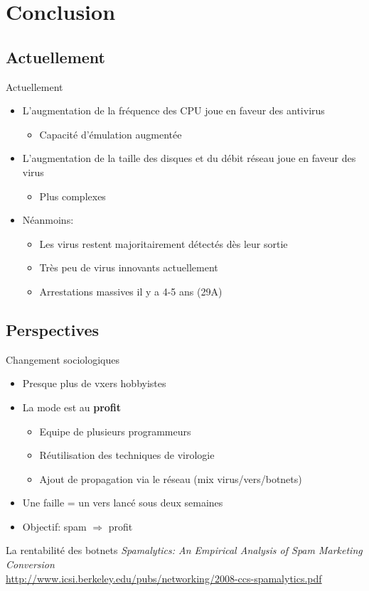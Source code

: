 \documentclass{beamer}
\begin{document}
\section{Conclusion}

\subsection{Actuellement}
\begin{frame}{Actuellement}
\begin{itemize}
\item L'augmentation de la fréquence des CPU joue en faveur des antivirus
\begin{itemize}
\item Capacité d'émulation augmentée
\end{itemize}
\item L'augmentation de la taille des disques et du débit réseau joue en faveur des virus
\begin{itemize}
\item Plus complexes
\end{itemize}
\item Néanmoins:
\begin{itemize}
\item Les virus restent majoritairement détectés dès leur sortie
\item Très peu de virus innovants actuellement
\item Arrestations massives il y a 4-5 ans (29A)
\end{itemize}
\end{itemize}
\end{frame}


\subsection{Perspectives}
\begin{frame}{Changement sociologiques}
\begin{itemize}
\item Presque plus de vxers hobbyistes
\item La mode est au \textbf{profit}
\begin{itemize}
\item Equipe de plusieurs programmeurs
\item Réutilisation des techniques de virologie
\item Ajout de propagation via le réseau (mix virus/vers/botnets)
\end{itemize}
\item Une faille = un vers lancé sous deux semaines
\item Objectif: spam $\Rightarrow$ profit
\end{itemize}
\begin{exampleblock}{La rentabilité des botnets}
\textit{Spamalytics: An Empirical Analysis of Spam Marketing Conversion}\\ \url{http://www.icsi.berkeley.edu/pubs/networking/2008-ccs-spamalytics.pdf}
\end{exampleblock}
\end{frame}
\end{document}
